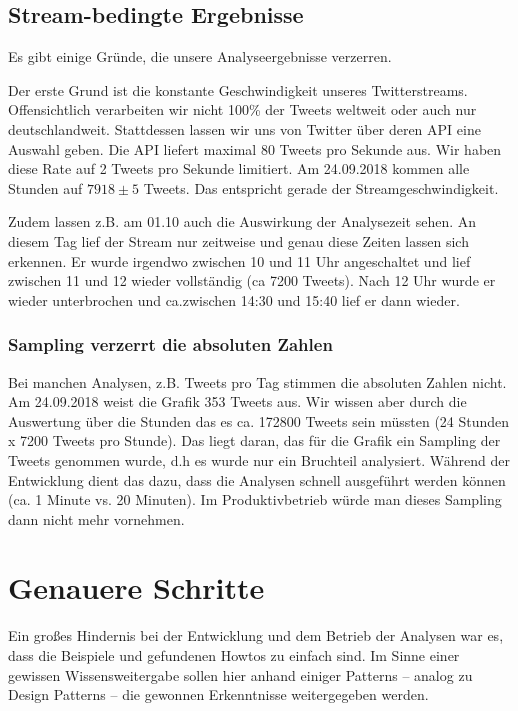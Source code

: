 \subsection{Stream-bedingte Ergebnisse}
Es gibt einige Gründe, die unsere Analyseergebnisse verzerren.

Der erste Grund ist die konstante Geschwindigkeit unseres
Twitterstreams. Offensichtlich verarbeiten wir nicht 100\% der Tweets
weltweit oder auch nur deutschlandweit. Stattdessen lassen wir uns von
Twitter über deren API eine Auswahl geben. Die API liefert maximal 80
Tweets pro Sekunde aus. Wir haben diese Rate auf 2 Tweets pro Sekunde
limitiert. Am 24.09.2018 kommen alle
Stunden auf $7918 \pm 5$ Tweets. Das entspricht gerade
der Streamgeschwindigkeit.

Zudem lassen z.B. am 01.10 auch die Auswirkung der Analysezeit sehen. An
diesem Tag lief der Stream nur zeitweise und genau diese Zeiten lassen
sich erkennen. Er wurde irgendwo zwischen 10 und 11 Uhr angeschaltet
und lief zwischen 11 und 12 wieder vollständig (ca 7200 Tweets). Nach
12 Uhr wurde er wieder unterbrochen und ca.zwischen 14:30 und 15:40
lief er dann wieder. 

\subsubsection{Sampling verzerrt die absoluten
Zahlen}
Bei manchen Analysen, z.B. Tweets pro Tag stimmen die absoluten Zahlen
nicht. Am 24.09.2018 weist die Grafik 353 Tweets aus. Wir wissen aber
durch die Auswertung über die Stunden das es ca. 172800 Tweets sein
müssten (24 Stunden x 7200 Tweets pro Stunde). Das liegt daran, das
für die Grafik ein Sampling der Tweets genommen wurde, d.h es wurde nur
ein Bruchteil analysiert. Während der Entwicklung dient das dazu, dass
die Analysen schnell ausgeführt werden können (ca. 1 Minute vs. 20
Minuten). Im Produktivbetrieb würde man dieses Sampling dann nicht mehr
vornehmen.

\section{Genauere Schritte}
Ein großes Hindernis bei der Entwicklung und dem Betrieb der Analysen
war es, dass die Beispiele und gefundenen Howtos zu einfach sind. Im
Sinne einer gewissen Wissensweitergabe sollen hier anhand einiger
Patterns – analog zu Design Patterns – die gewonnen Erkenntnisse
weitergegeben werden. 

